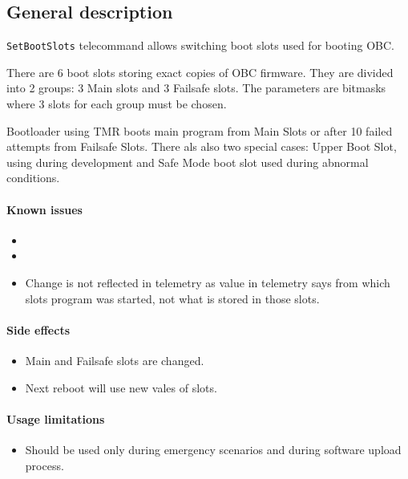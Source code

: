 

\subsection{General description}
\texttt{SetBootSlots} telecommand allows switching boot slots used for booting OBC. 

There are 6 boot slots storing exact copies of OBC firmware. They are divided into 2 groups: 3 Main slots and 3 Failsafe slots. 
The parameters are bitmasks where 3 slots for each group must be chosen.

Bootloader using TMR boots main program from Main Slots or after 10 failed attempts from Failsafe Slots.
There als also two special cases: Upper Boot Slot, using during development and Safe Mode boot slot used during abnormal conditions.

\paragraph{Known issues}
\begin{itemize}
    \item {}
	\item {}
	\item Change is not reflected in telemetry as value in telemetry says from which slots program was started, not what is stored in those slots.
\end{itemize}

\paragraph{Side effects}
\begin{itemize}
	\item Main and Failsafe slots are changed.
	\item Next reboot will use new vales of slots.
\end{itemize}

\paragraph{Usage limitations} 
\begin{itemize}
	\item Should be used only during emergency scenarios and during software upload process.
\end{itemize}

